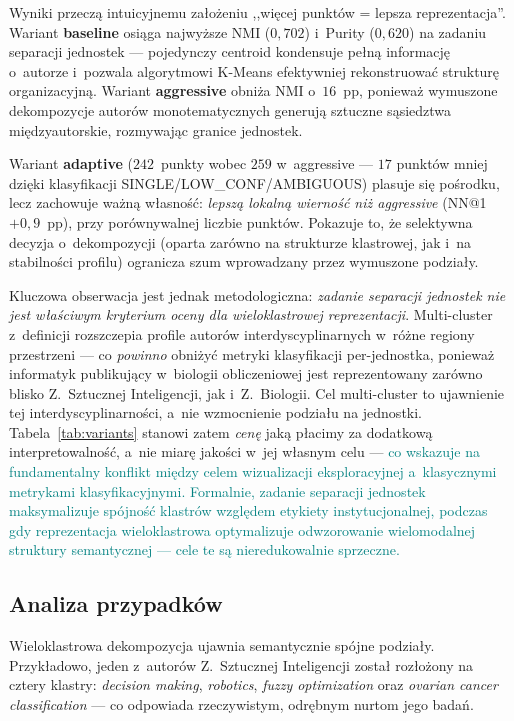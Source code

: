 \documentclass[a4paper,11pt,twocolumn]{article}
\newcommand{\hlme}[1]{\textcolor{teal}{#1}}
\begin{document}
Wyniki przeczą intuicyjnemu założeniu ,,więcej punktów = lepsza
reprezentacja''. Wariant \textbf{baseline} osiąga najwyższe NMI
($0{,}702$) i~Purity ($0{,}620$) na zadaniu separacji jednostek ---
pojedynczy centroid kondensuje pełną informację o~autorze i~pozwala
algorytmowi K-Means efektywniej rekonstruować strukturę
organizacyjną. Wariant \textbf{aggressive} obniża NMI o~$16$~pp,
ponieważ wymuszone dekompozycje autorów monotematycznych generują
sztuczne sąsiedztwa międzyautorskie, rozmywając granice jednostek.

Wariant \textbf{adaptive} ($242$~punkty wobec $259$ w~aggressive ---
$17$ punktów mniej dzięki klasyfikacji SINGLE/LOW\_CONF/AMBIGUOUS)
plasuje się pośrodku, lecz zachowuje ważną własność: \emph{lepszą
lokalną wierność niż aggressive} (NN@1 $+0{,}9$~pp), przy
porównywalnej liczbie punktów. Pokazuje to, że selektywna decyzja
o~dekompozycji (oparta zarówno na strukturze klastrowej, jak i~na
stabilności profilu) ogranicza szum wprowadzany przez wymuszone
podziały.

Kluczowa obserwacja jest jednak metodologiczna: \emph{zadanie
separacji jednostek nie jest właściwym kryterium oceny dla
wieloklastrowej reprezentacji}. Multi-cluster z~definicji rozszczepia
profile autorów interdyscyplinarnych w~różne regiony przestrzeni ---
co \emph{powinno} obniżyć metryki klasyfikacji per-jednostka, ponieważ
informatyk publikujący w~biologii obliczeniowej jest reprezentowany
zarówno blisko Z.~Sztucznej Inteligencji, jak i~Z.~Biologii. Cel
multi-cluster to ujawnienie tej interdyscyplinarności, a~nie
wzmocnienie podziału na jednostki. Tabela~\ref{tab:variants} stanowi
zatem \emph{cenę} jaką płacimy za dodatkową interpretowalność, a~nie
miarę jakości w~jej własnym celu --- \hlme{co wskazuje na fundamentalny
konflikt między celem wizualizacji eksploracyjnej
a~klasycznymi metrykami klasyfikacyjnymi.
Formalnie, zadanie separacji jednostek maksymalizuje spójność klastrów
względem etykiety instytucjonalnej, podczas gdy reprezentacja
wieloklastrowa optymalizuje odwzorowanie wielomodalnej struktury
semantycznej --- cele te są nieredukowalnie sprzeczne.}


\subsection{Analiza przypadków}

Wieloklastrowa dekompozycja ujawnia semantycznie spójne podziały.
Przykładowo, jeden z~autorów Z.~Sztucznej Inteligencji został
rozłożony na cztery klastry: \emph{decision making}, \emph{robotics},
\emph{fuzzy optimization} oraz \emph{ovarian cancer classification}
--- co odpowiada rzeczywistym, odrębnym nurtom jego badań.
\end{document}
